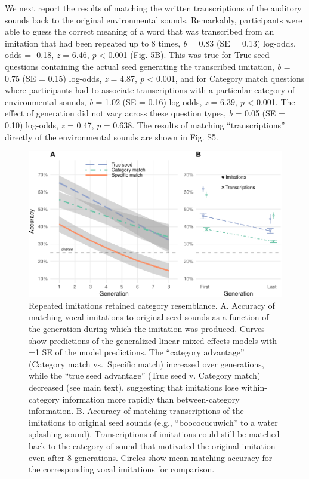 \documentclass[english,floatsintext,man]{apa6}
\theoremstyle{definition}
\theoremstyle{definition}
\theoremstyle{definition}
\theoremstyle{remark}
\begin{document}
We next report the results of matching the written transcriptions of the
auditory sounds back to the original environmental sounds. Remarkably,
participants were able to guess the correct meaning of a word that was
transcribed from an imitation that had been repeated up to 8 times,
\emph{b} = 0.83 (SE = 0.13) log-odds, odds = -0.18, \emph{z} = 6.46,
\emph{p} \textless{} 0.001 (Fig. 5B). This was true for True seed
questions containing the actual seed generating the transcribed
imitation, \emph{b} = 0.75 (SE = 0.15) log-odds, \emph{z} = 4.87,
\emph{p} \textless{} 0.001, and for Category match questions where
participants had to associate transcriptions with a particular category
of environmental sounds, \emph{b} = 1.02 (SE = 0.16) log-odds, \emph{z}
= 6.39, \emph{p} \textless{} 0.001. The effect of generation did not
vary across these question types, \emph{b} = 0.05 (SE = 0.10) log-odds,
\emph{z} = 0.47, \emph{p} = 0.638. The results of matching
\enquote{transcriptions} directly of the environmental sounds are shown
in Fig. S5.

\begin{figure}
\centering
\includegraphics{fig5-1.pdf}
\caption{\label{fig:fig5}Repeated imitations retained category resemblance.
A. Accuracy of matching vocal imitations to original seed sounds as a
function of the generation during which the imitation was produced.
Curves show predictions of the generalized linear mixed effects models
with ±1 SE of the model predictions. The \enquote{category advantage}
(Category match vs.~Specific match) increased over generations, while
the \enquote{true seed advantage} (True seed v. Category match)
decreased (see main text), suggesting that imitations lose
within-category information more rapidly than between-category
information. B. Accuracy of matching transcriptions of the imitations to
original seed sounds (e.g., \enquote{boococucuwich} to a water splashing
sound). Transcriptions of imitations could still be matched back to the
category of sound that motivated the original imitation even after 8
generations. Circles show mean matching accuracy for the corresponding
vocal imitations for comparison.}
\end{figure}
\end{document}
